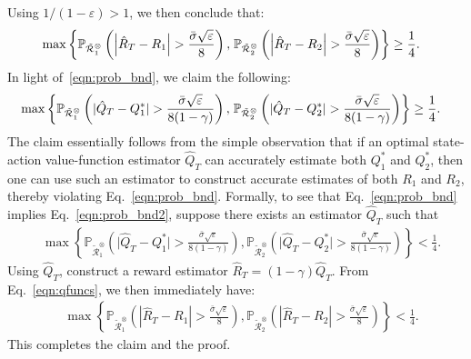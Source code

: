 \documentclass{article}
\newcommand{\mc}{\mathcal}
\begin{document}
Using $1/(1-\varepsilon) > 1$, we then conclude that:
\begin{equation}\label{eqn:prob_bnd}
    \begin{aligned}
        &\max\left\{ \mathbb{P}_{\tilde{\mc{R}}_{1}^{\otimes}}\left( \left| \hat{R}_T - R_1 \right| > \frac{\bar{\sigma} \sqrt{\varepsilon}}{8} \right), \right.\left.\hspace{-1mm} \mathbb{P}_{\tilde{\mc{R}}_{2}^{\otimes}}\left( \left| \hat{R}_T - R_2 \right| > \frac{\bar{\sigma} \sqrt{\varepsilon}}{8} \right) \right\} \geq \frac{1}{4}.
    \end{aligned}
\end{equation}
 In light of~\eqref{eqn:prob_bnd}, we claim the following: 
\begin{equation}\label{eqn:prob_bnd2}
    \begin{aligned}
        &\max\left\{ \mathbb{P}_{\tilde{\mc{R}}_{1}^{\otimes}}\left( \vert \hat{Q}_T - Q^*_1 \vert >  \frac{\bar{\sigma} \sqrt{\varepsilon}}{8 (1-\gamma) } \right), \right.\left.\hspace{-1mm}\mathbb{P}_{\tilde{\mc{R}}_{2}^{\otimes}}\left( \vert \hat{Q}_T - Q^*_2 \vert > \frac{\bar{\sigma} \sqrt{\varepsilon}}{8 (1-\gamma) } \right) \right\} \geq \frac{1}{4}.
    \end{aligned}
\end{equation}
The claim essentially follows from the simple observation that if an optimal state-action value-function estimator $\hat{Q}_T$ can accurately estimate both $Q^*_1$ and $Q^*_2$, then one can use such an estimator to construct accurate estimates of both $R_1$ and $R_2$, thereby violating Eq.~\eqref{eqn:prob_bnd}. Formally, to see that Eq.~\eqref{eqn:prob_bnd} implies Eq.~\eqref{eqn:prob_bnd2}, suppose there exists an estimator $\hat{Q}_T$ such that
\begin{equation}
    \begin{aligned}
        &\max\left\{ \mathbb{P}_{\tilde{\mc{R}}_{1}^{\otimes}}\left( \vert \hat{Q}_T - Q^*_1 \vert > \frac{\bar{\sigma} \sqrt{\varepsilon}}{8 (1-\gamma) } \right), \right.\left. \mathbb{P}_{\tilde{\mc{R}}_{2}^{\otimes}}\left( \vert \hat{Q}_T - Q^*_2 \vert > \frac{\bar{\sigma} \sqrt{\varepsilon}}{8 (1-\gamma) } \right) \right\} < \frac{1}{4}.
    \end{aligned}
\end{equation}
Using $\hat{Q}_T$, construct a reward estimator $\hat{R}_T = (1-\gamma) \hat{Q
}_T$. From Eq.~\eqref{eqn:qfuncs}, we then immediately have:
\begin{equation}
    \begin{aligned}
        &\max\left\{ \mathbb{P}_{\tilde{\mc{R}}_{1}^{\otimes}}\left( \left| \hat{R}_T - R_1 \right| > \frac{\bar{\sigma} \sqrt{\varepsilon}}{8} \right), \right.\left. \mathbb{P}_{\tilde{\mc{R}}_{2}^{\otimes}}\left( \left| \hat{R}_T - R_2 \right| > \frac{\bar{\sigma} \sqrt{\varepsilon}}{8} \right) \right\} < \frac{1}{4}.
    \end{aligned}
\end{equation}
This completes the claim and the proof.
\end{document}
